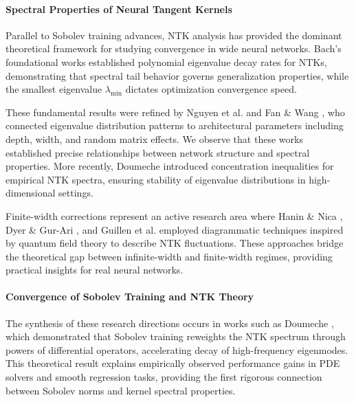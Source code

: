 \documentclass[a4paper]{article}
\theoremstyle{plain}
\theoremstyle{definition}
\theoremstyle{remark}
\begin{document}
\paragraph{Spectral Properties of Neural Tangent Kernels}

Parallel to Sobolev training advances, NTK analysis has provided the dominant theoretical framework for studying convergence in wide neural networks. Bach's foundational works \cite{bach2017breaking,bach2021ntk_eigenvalues} established polynomial eigenvalue decay rates for NTKs, demonstrating that spectral tail behavior governs generalization properties, while the smallest eigenvalue $\lambda_{\min}$ dictates optimization convergence speed.

These fundamental results were refined by Nguyen et al. \cite{nguyen2022ntk_eigenvalues} and Fan \& Wang \cite{fan2020spectra}, who connected eigenvalue distribution patterns to architectural parameters including depth, width, and random matrix effects. We observe that these works established precise relationships between network structure and spectral properties. More recently, Doumeche \cite{doumeche2023ntk_spectral} introduced concentration inequalities for empirical NTK spectra, ensuring stability of eigenvalue distributions in high-dimensional settings.

Finite-width corrections represent an active research area where Hanin \& Nica \cite{hanin_nica_2019}, Dyer \& Gur-Ari \cite{dyer_gur_ari_2019}, and Guillen et al. \cite{guillen_misof_gerken_2025} employed diagrammatic techniques inspired by quantum field theory to describe NTK fluctuations. These approaches bridge the theoretical gap between infinite-width and finite-width regimes, providing practical insights for real neural networks.

\paragraph{Convergence of Sobolev Training and NTK Theory}

The synthesis of these research directions occurs in works such as Doumeche \cite{doumeche2023sobolev_ntk}, which demonstrated that Sobolev training reweights the NTK spectrum through powers of differential operators, accelerating decay of high-frequency eigenmodes. This theoretical result explains empirically observed performance gains in PDE solvers and smooth regression tasks, providing the first rigorous connection between Sobolev norms and kernel spectral properties.
\end{document}
